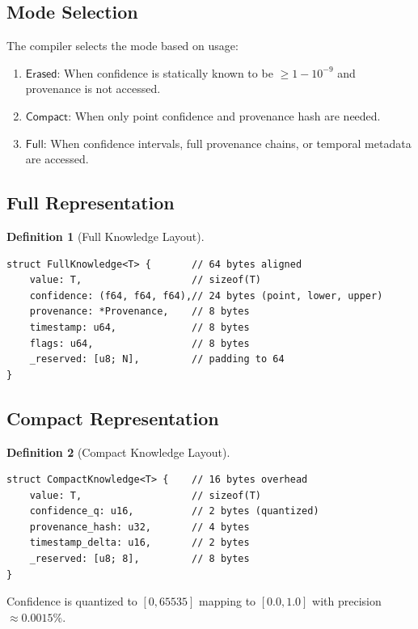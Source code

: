 \documentclass[11pt]{article}
\newtheorem{definition}{Definition}
\newcommand{\Full}{\mathsf{Full}}
\newcommand{\Compact}{\mathsf{Compact}}
\newcommand{\Erased}{\mathsf{Erased}}
\begin{document}
\subsection{Mode Selection}

The compiler selects the mode based on usage:

\begin{enumerate}
\item $\Erased$: When confidence is statically known to be $\geq 1 - 10^{-9}$
      and provenance is not accessed.
\item $\Compact$: When only point confidence and provenance hash are needed.
\item $\Full$: When confidence intervals, full provenance chains, or temporal
      metadata are accessed.
\end{enumerate}

\subsection{Full Representation}

\begin{definition}[Full Knowledge Layout]
\begin{verbatim}
struct FullKnowledge<T> {       // 64 bytes aligned
    value: T,                   // sizeof(T)
    confidence: (f64, f64, f64),// 24 bytes (point, lower, upper)
    provenance: *Provenance,    // 8 bytes
    timestamp: u64,             // 8 bytes
    flags: u64,                 // 8 bytes
    _reserved: [u8; N],         // padding to 64
}
\end{verbatim}
\end{definition}

\subsection{Compact Representation}

\begin{definition}[Compact Knowledge Layout]
\begin{verbatim}
struct CompactKnowledge<T> {    // 16 bytes overhead
    value: T,                   // sizeof(T)
    confidence_q: u16,          // 2 bytes (quantized)
    provenance_hash: u32,       // 4 bytes
    timestamp_delta: u16,       // 2 bytes
    _reserved: [u8; 8],         // 8 bytes
}
\end{verbatim}
\end{definition}

Confidence is quantized to $[0, 65535]$ mapping to $[0.0, 1.0]$ with
precision $\approx 0.0015\%$.
\end{document}
